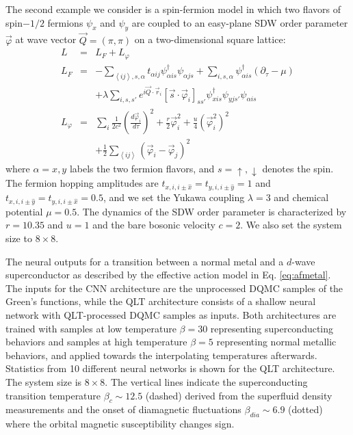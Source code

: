 \documentclass[amsmath,amssymb, aps, prl, twocolumn]{revtex4-1}
\begin{document}
 The second example we consider is a spin-fermion model in which two flavors of spin$-1/2$ fermions $\psi_x$ and $\psi_y$ are coupled to an easy-plane SDW order parameter $\vec{\varphi}$ at wave vector $\vec Q=(\pi, \pi)$ on a two-dimensional square lattice\cite{Erez2016}:
\begin{eqnarray}
L&=&L_F+L_\varphi \nonumber\\
L_F &=&  -\sum_{\left\langle ij \right\rangle, s, \alpha} t_{\alpha ij} \psi_{\alpha is}^\dagger \psi_{\alpha js} + \sum_{i, s, \alpha} \psi_{\alpha is}^\dagger \left(\partial_\tau - \mu \right)\nonumber \\
& & +\lambda \sum_{i,s,s'} e^{i \vec Q\cdot \vec r_i} \left[ \vec s\cdot \vec \varphi_i\right]_{ss'} \psi_{xis}^\dagger \psi_{yjs'}\psi_{\alpha is} \nonumber\\
L_\varphi &=& \sum_i \frac{1}{2c^2} \left(\frac{d\vec\varphi_i}{d\tau}\right)^2 + \frac{r}{2}\vec \varphi_i^2 + \frac{u}{4} (\vec \varphi_i^2)^2 \nonumber \\
& & +\frac{1}{2}\sum_{\left\langle ij \right\rangle} (\vec \varphi_i - \vec \varphi_j)^2
\label{eq:afmetal}
\end{eqnarray}
where $\alpha=x,y$ labels the two fermion flavors, and $s = \uparrow, \downarrow$ denotes the spin. The fermion hopping amplitudes are $t_{x,i,i\pm\hat x}=t_{y,i,i\pm\hat y}=1$ and $t_{x,i,i\pm\hat y}=t_{y,i,i\pm\hat x}=0.5$, and we set the Yukawa coupling $\lambda=3$ and chemical potential $\mu=0.5$. The dynamics of the SDW order parameter is characterized by $r=10.35$ and $u=1$ and the bare bosonic velocity $c=2$. We also set the system size to $8\times 8$. 


The neural outputs for a transition between a normal metal and a $d$-wave superconductor as described by the effective action model in Eq. \ref{eq:afmetal}. The inputs for the CNN architecture are the unprocessed DQMC samples of the Green's functions, while the QLT architecture consists of a shallow neural network with QLT-processed DQMC samples as inputs. Both architectures are trained with samples at low temperature $\beta=30$ representing superconducting behaviors and samples at high temperature $\beta=5$ representing normal metallic behaviors, and applied towards the interpolating temperatures afterwards. Statistics from 10 different neural networks is shown for the QLT architecture. The system size is $8\times 8$. The vertical lines indicate the superconducting transition temperature $\beta_c\sim 12.5$ (dashed) derived from the superfluid density measurements and the onset of diamagnetic fluctuations $\beta_{dia} \sim 6.9$ (dotted) where the orbital magnetic susceptibility changes sign\cite{Erez2016}.
\end{document}
